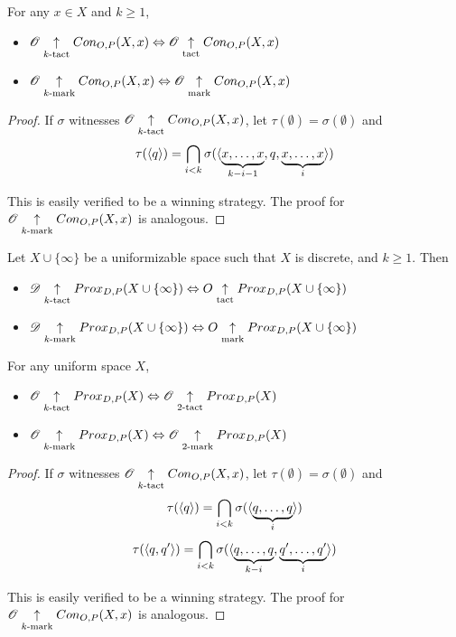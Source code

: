 \begin{proposition} For any $x\in X$ and $k\geq 1$,
  \begin{itemize}
    \item
      $\mathscr{O}\underset{k\text{-tact}}{\uparrow}Con_{O,P}(X,x) \Leftrightarrow \mathscr{O}\underset{\text{tact}}{\uparrow}Con_{O,P}(X,x)$
    \item
      $\mathscr{O}\underset{k\text{-mark}}{\uparrow}Con_{O,P}(X,x) \Leftrightarrow \mathscr{O}\underset{\text{mark}}{\uparrow}Con_{O,P}(X,x)$
  \end{itemize}
\end{proposition}

\begin{proof}
  If $\sigma$ witnesses $\mathscr{O}\underset{k\text{-tact}}{\uparrow}Con_{O,P}(X,x)$, let $\tau(\emptyset)=\sigma(\emptyset)$ and
    \[
      \tau(\langle q\rangle)
        =
      \bigcap_{i< k}
      \sigma(\langle\underbrace{x,\dots,x}_{k-i-1},q,\underbrace{x,\dots,x}_{i}\rangle)
    \]

  This is easily verified to be a winning strategy. The proof for $\mathscr{O}\underset{k\text{-mark}}{\uparrow}Con_{O,P}(X,x)$ is analogous.
\end{proof}

\begin{corollary}
  Let $X\cup\{\infty\}$ be a uniformizable space such that $X$ is discrete, and $k\geq 1$. Then
  \begin{itemize}
    \item
      $\mathscr{D}\underset{k\text{-tact}}{\uparrow}Prox_{D,P}(X\cup\{\infty\}) \Leftrightarrow O\underset{\text{tact}}{\uparrow}Prox_{D,P}(X\cup\{\infty\})$
    \item
      $\mathscr{D}\underset{k\text{-mark}}{\uparrow}Prox_{D,P}(X\cup\{\infty\}) \Leftrightarrow O\underset{\text{mark}}{\uparrow}Prox_{D,P}(X\cup\{\infty\})$
  \end{itemize}
\end{corollary}

\begin{proposition} For any uniform space $X$,
  \begin{itemize}
    \item
      $\mathscr{O}\underset{k\text{-tact}}{\uparrow}Prox_{D,P}(X) \Leftrightarrow \mathscr{O}\underset{2\text{-tact}}{\uparrow}Prox_{D,P}(X)$
    \item
      $\mathscr{O}\underset{k\text{-mark}}{\uparrow}Prox_{D,P}(X) \Leftrightarrow \mathscr{O}\underset{2\text{-mark}}{\uparrow}Prox_{D,P}(X)$
  \end{itemize}
\end{proposition}

\begin{proof}
  If $\sigma$ witnesses $\mathscr{O}\underset{k\text{-tact}}{\uparrow}Con_{O,P}(X,x)$, let $\tau(\emptyset)=\sigma(\emptyset)$ and
    \[
      \tau(\langle q\rangle)
        =
      \bigcap_{i<k}
      \sigma(\langle\underbrace{q,\dots,q}_{i}\rangle)
    \]
    \[
      \tau(\langle q,q'\rangle)
        =
      \bigcap_{i< k}
      \sigma(\langle\underbrace{q,\dots,q}_{k-i},\underbrace{q',\dots,q'}_{i}\rangle)
    \]

  This is easily verified to be a winning strategy. The proof for $\mathscr{O}\underset{k\text{-mark}}{\uparrow}Con_{O,P}(X,x)$ is analogous.
\end{proof}

